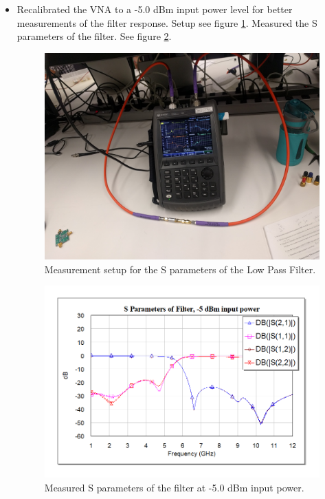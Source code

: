 \documentclass[twocolumn, aps, apl]{revtex4-1}
\begin{document}
\begin{itemize}
    \item Recalibrated the VNA to a -5.0 dBm input power level for better measurements of the filter response. Setup see figure \ref{fig:filterimg}. Measured the S parameters of the filter. See figure \ref{fig:filterSparams}.

    \begin{figure}[!htbp]
    \centering
    \includegraphics[scale=0.05]{Filter.jpg}
    \caption{Measurement setup for the S parameters of the Low Pass Filter.}
    \label{fig:filterimg}
    \end{figure}

    \begin{figure}[!htbp]
    \centering
    \includegraphics[scale=0.35]{filter_S_params.png}
    \caption{Measured S parameters of the filter at -5.0 dBm input power.}
    \label{fig:filterSparams}
    \end{figure}


\end{itemize}
\end{document}
